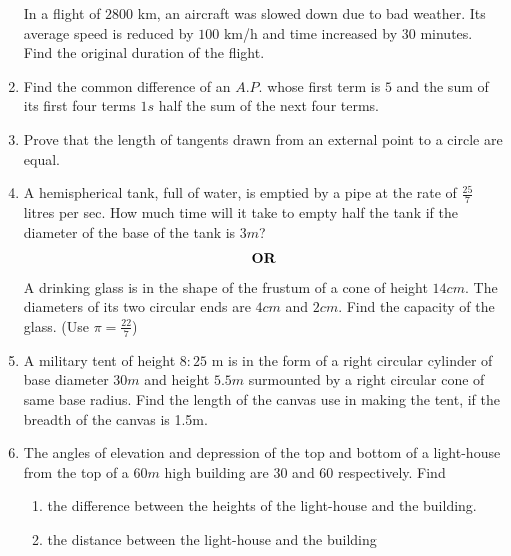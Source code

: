 \documentclass[journal,12pt,twocolumn]{IEEEtran}
\renewcommand\thesection{\arabic{section}}
\begin{document}
\begin{enumerate}[label=\thesection.\arabic*.,ref=\thesection.\theenumi]
In a flight of $2800$ km, an aircraft was slowed down due to bad
weather. Its average speed is reduced by $100$ km/h and time
increased by $30$ minutes. Find the original duration of the flight.\\
\item Find the common difference of an $A.P$. whose first term is $5$ and the sum of its first four terms $1s$ half the sum of the next four terms.\\
\item Prove that the length of tangents drawn from an external point to a circle are equal.\\
\item A hemispherical tank, full of water, is emptied by a pipe at the rate of $\frac{25}{7}$ litres per sec. How much time will it take to empty half the tank if the diameter of the base of the tank is $3m$?\\
\begin{align}
    \centering \vec{OR}\nonumber
\end{align}
A drinking glass is in the shape of the frustum of a cone of height $14cm$. The diameters of its two circular ends are $4cm$ and $2cm$. Find the capacity of the glass. (Use $\pi = \frac{22}{7}$)\\
\item A military tent of height $8:25$ m is in the form of a right circular cylinder of base diameter $30m$ and height $5.5m$ surmounted by a right circular cone of same base radius. Find the length of the canvas use in making the tent, if the breadth of the canvas is 1.5m.\\
\item The angles of elevation and depression of the top and bottom of a light-house from the top of a $60m$ high building are $30$ and $60$ respectively. Find
 \begin{enumerate}
  \item the difference between the heights of the light-house and the building.
  \item the distance between the light-house and the building
 \end{enumerate}
\end{enumerate}
\end{document}
